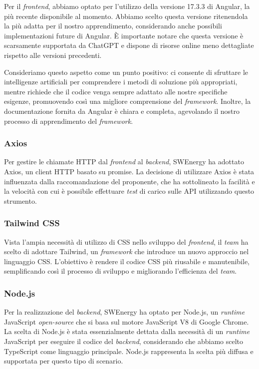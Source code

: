 Per il \textit{frontend}, abbiamo optato per l'utilizzo della versione 17.3.3 di
Angular, la più recente disponibile al momento. Abbiamo scelto questa versione
ritenendola la più adatta per il nostro apprendimento, considerando anche
possibili implementazioni future di Angular. È importante notare che questa
versione è scarsamente supportata da ChatGPT e dispone di risorse online meno
dettagliate rispetto alle versioni precedenti.

Consideriamo questo aspetto come un punto positivo: ci consente di sfruttare le
intelligenze artificiali per comprendere i metodi di soluzione più appropriati,
mentre richiede che il codice venga sempre adattato alle nostre specifiche
esigenze, promuovendo così una migliore comprensione del \textit{framework}.
Inoltre, la documentazione fornita da Angular è chiara e completa, agevolando il
nostro processo di apprendimento del \textit{framework}.

\subsubsection{Axios}

Per gestire le chiamate HTTP dal \textit{frontend} al \textit{backend}, SWEnergy
ha adottato Axios, un client HTTP basato su promise. La decisione di utilizzare
Axios è stata influenzata dalla raccomandazione del proponente, che ha
sottolineato la facilità e la velocità con cui è possibile effettuare \textit{test} di
carico sulle API utilizzando questo strumento.

\subsubsection{Tailwind CSS}

Vista l'ampia necessità di utilizzo di CSS nello sviluppo del \textit{frontend},
il \textit{team} ha scelto di adottare Tailwind, un \textit{framework} che introduce un
nuovo approccio nel linguaggio CSS. L'obiettivo è rendere il codice CSS più
riusabile e manutenibile, semplificando così il processo di sviluppo e
migliorando l'efficienza del \textit{team}.

\subsubsection{Node.js}

Per la realizzazione del \textit{backend}, SWEnergy ha optato per Node.js, un
\textit{runtime} JavaScript \textit{open-source} che si basa sul motore JavaScript V8 di
Google Chrome. La scelta di Node.js è stata essenzialmente dettata dalla
necessità di un \textit{runtime} JavaScript per eseguire il codice del
\textit{backend}, considerando che abbiamo scelto TypeScript come linguaggio
principale. Node.js rappresenta la scelta più diffusa e supportata per questo
tipo di scenario.

